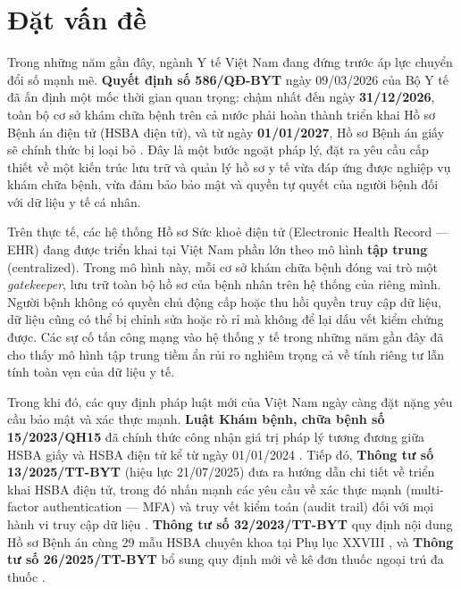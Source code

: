 \documentclass[../DoAn]{subfiles}
\begin{document}

\section{Đặt vấn đề}

Trong những năm gần đây, ngành Y tế Việt Nam đang đứng trước áp lực chuyển đổi số mạnh mẽ. \textbf{Quyết định số 586/QĐ-BYT} ngày 09/03/2026 của Bộ Y tế đã ấn định một mốc thời gian quan trọng: chậm nhất đến ngày \textbf{31/12/2026}, toàn bộ cơ sở khám chữa bệnh trên cả nước phải hoàn thành triển khai Hồ sơ Bệnh án điện tử (HSBA điện tử), và từ ngày \textbf{01/01/2027}, Hồ sơ Bệnh án giấy sẽ chính thức bị loại bỏ \cite{qd586_2026_byt}. Đây là một bước ngoặt pháp lý, đặt ra yêu cầu cấp thiết về một kiến trúc lưu trữ và quản lý hồ sơ y tế vừa đáp ứng được nghiệp vụ khám chữa bệnh, vừa đảm bảo bảo mật và quyền tự quyết của người bệnh đối với dữ liệu y tế cá nhân.

Trên thực tế, các hệ thống Hồ sơ Sức khoẻ điện tử (Electronic Health Record --- EHR) đang được triển khai tại Việt Nam phần lớn theo mô hình \textbf{tập trung} (centralized). Trong mô hình này, mỗi cơ sở khám chữa bệnh đóng vai trò một \textit{gatekeeper}, lưu trữ toàn bộ hồ sơ của bệnh nhân trên hệ thống của riêng mình. Người bệnh không có quyền chủ động cấp hoặc thu hồi quyền truy cập dữ liệu, dữ liệu cũng có thể bị chỉnh sửa hoặc rò rỉ mà không để lại dấu vết kiểm chứng được. Các sự cố tấn công mạng vào hệ thống y tế trong những năm gần đây đã cho thấy mô hình tập trung tiềm ẩn rủi ro nghiêm trọng cả về tính riêng tư lẫn tính toàn vẹn của dữ liệu y tế.

Trong khi đó, các quy định pháp luật mới của Việt Nam ngày càng đặt nặng yêu cầu bảo mật và xác thực mạnh. \textbf{Luật Khám bệnh, chữa bệnh số 15/2023/QH15} đã chính thức công nhận giá trị pháp lý tương đương giữa HSBA giấy và HSBA điện tử kể từ ngày 01/01/2024 \cite{luatkcb2023}. Tiếp đó, \textbf{Thông tư số 13/2025/TT-BYT} (hiệu lực 21/07/2025) đưa ra hướng dẫn chi tiết về triển khai HSBA điện tử, trong đó nhấn mạnh các yêu cầu về xác thực mạnh (multi-factor authentication --- MFA) và truy vết kiểm toán (audit trail) đối với mọi hành vi truy cập dữ liệu \cite{tt13_2025_byt}. \textbf{Thông tư số 32/2023/TT-BYT} quy định nội dung Hồ sơ Bệnh án cùng 29 mẫu HSBA chuyên khoa tại Phụ lục XXVIII \cite{tt32_2023_byt}, và \textbf{Thông tư số 26/2025/TT-BYT} bổ sung quy định mới về kê đơn thuốc ngoại trú đa thuốc \cite{tt26_2025_byt}.
\end{document}
